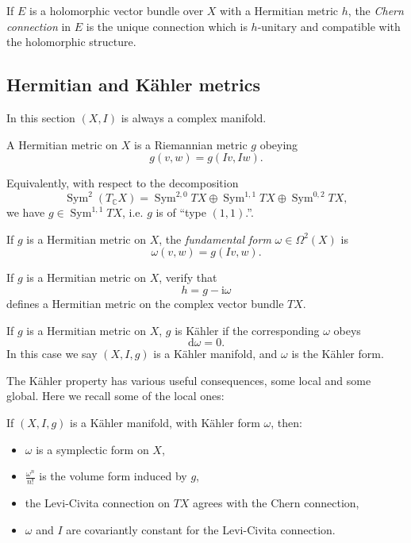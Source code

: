\documentclass[12pt,letterpaper,reqno]{amsart}
\numberwithin{equation}{section}
\newcommand{\C}{\ensuremath{\mathbb C}}
\newcommand{\kahler}{K\"ahler\xspace}
\newcommand{\I}{{\mathrm i}}
\newcommand{\de}{\mathrm{d}}
\newcommand{\ti}[1]{\textit{#1}}
\DeclareMathOperator{\Sym}{Sym}
\begin{document}
\begin{defn}
If $E$ is a holomorphic vector bundle over $X$ with
a Hermitian metric $h$, the \ti{Chern connection} 
in $E$ is the unique connection which is 
$h$-unitary and compatible with the holomorphic
structure.
\end{defn}

\subsection{Hermitian and \kahler metrics}

In this section $(X,I)$ is always a complex manifold.

\begin{defn} A Hermitian metric on $X$ is a Riemannian
metric $g$ obeying
$$ g(v,w) = g(Iv,Iw). $$
\end{defn}
Equivalently, with respect to the decomposition 
\begin{equation}
  \Sym^2 (T_\C X) = \Sym^{2,0} TX \oplus \Sym^{1,1} TX \oplus \Sym^{0,2} TX,
\end{equation}
we have $g \in \Sym^{1,1} TX$, i.e. $g$ is of ``type $(1,1)$.''.

\begin{defn} If $g$ is a Hermitian metric on $X$, 
the \ti{fundamental form} $\omega \in \Omega^2(X)$
is
\begin{equation}
  \omega(v,w) = g(Iv,w).
\end{equation}
\end{defn}

\begin{exercise} If $g$ is a Hermitian metric on $X$,
verify that
\begin{equation}
  h = g - \I \omega
\end{equation}
defines a Hermitian metric on the complex vector
bundle $TX$.
\end{exercise}

\begin{defn} If $g$ is a Hermitian metric on $X$,
$g$ is \kahler if the corresponding $\omega$ obeys
\begin{equation}
  \de \omega = 0.
\end{equation}
In this case we say $(X,I,g)$ is a \kahler manifold,
and $\omega$ is the \kahler form.
\end{defn}

The \kahler property has various useful consequences,
some local and some global. Here we recall some
of the local ones:
\begin{prop}
If $(X,I,g)$ is a \kahler manifold, with
\kahler form $\omega$, then:
\begin{itemize}
  \item $\omega$ is a symplectic form on $X$,
  \item $\frac{\omega^n}{n!}$ is the volume form induced by $g$,
  \item the Levi-Civita connection on $TX$ agrees with the Chern connection,
  \item $\omega$ and $I$ are covariantly constant for the Levi-Civita connection.
\end{itemize}

\end{prop}
\end{document}

